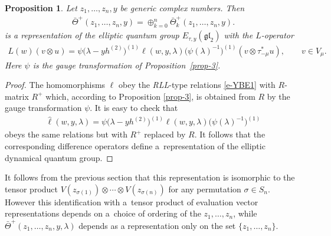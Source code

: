 \documentclass[pdftex]{sigma}
\numberwithin{equation}{section}
\newtheorem{Proposition}[Theorem]{Proposition}
 { \theoremstyle{definition}
\newtheorem{Definition}[Theorem]{Definition}
\newtheorem{Example}[Theorem]{Example}
\newtheorem{Remark}[Theorem]{Remark} }
\begin{document}
\begin{Proposition}\label{prop-7} Let $z_1,\dots,z_n,y$ be generic complex numbers. Then
 \begin{gather*}
 \bar\Theta^+(z_1,\dots,z_n,y)=\oplus_{k=0}^n\bar\Theta^+_k(z_1,\dots,z_n,y).
 \end{gather*}
 is a representation of the elliptic quantum group $E_{\tau,y}(\mathfrak{gl}_2)$ with the $L$-operator
 \begin{gather*}
 L(w)(v\otimes u)=\psi\big(\lambda-yh^{(2)}\big)^{(1)}\ell(w,y,\lambda)\big(\psi(\lambda)^{-1}\big)^{(1)}(v\otimes\tau_{-\mu}^*u),\qquad v\in V_\mu.
 \end{gather*}
 Here $\psi$ is the gauge transformation of Proposition~{\rm \ref{prop-3}}.
\end{Proposition}
\begin{proof}The homomorphisms $\ell$ obey the {\em RLL}-type relations \eqref{e-YBE1} with $R$-matrix $R^+$ which, according to Proposition \ref{prop-3}, is obtained from $R$ by the gauge transformation $\psi$. It is easy to check that
\begin{gather*}
 \hat\ell(w,y,\lambda)= \psi\big(\lambda-yh^{(2)}\big)^{(1)}\ell(w,y,\lambda)\big(\psi(\lambda)^{-1}\big)^{(1)}
\end{gather*}
obeys the same relations but with $R^+$ replaced by $R$. It follows that the corresponding difference operators define a~representation of the elliptic dynamical quantum group.
\end{proof}

\begin{Remark} It follows from the previous section that this representation is isomorphic to the tensor product $V(z_{\sigma(1)})\otimes\cdots\otimes V(z_{\sigma(n)})$ for any permutation $\sigma\in S_n$. However this identification with a~tensor product of evaluation vector representations depends on a~choice of ordering of the $z_1,\dots,z_n$, while $\bar\Theta^+(z_1,\dots,z_n,y,\lambda)$ depends as a representation only on the set $\{z_1,\dots, z_n\}$.
\end{Remark}
\end{document}
